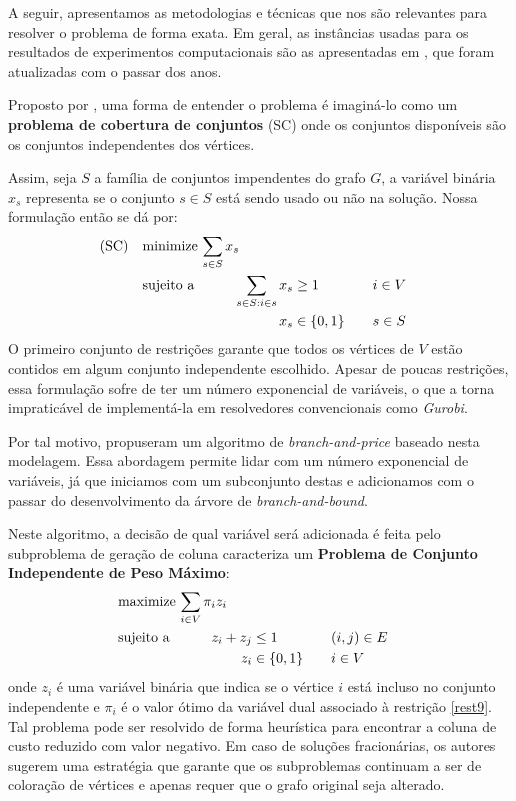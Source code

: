 \documentclass[10pt]{article}
\begin{document}
A seguir, apresentamos as metodologias e técnicas que nos são relevantes para resolver o problema de forma exata.
Em geral, as instâncias usadas para os resultados de experimentos computacionais são as apresentadas em \autocite{GraphColoringInstances}, que foram atualizadas com o passar dos anos.

Proposto por \textcite{Mehrotra1996ColumnGenerationApproach}, uma forma de entender o problema é imaginá-lo como um \textbf{problema de cobertura de conjuntos} (SC) onde os conjuntos disponíveis são os conjuntos independentes dos vértices.

Assim, seja \(S\) a família de conjuntos impendentes do grafo \(G\), a variável binária \(x_s\) representa se o conjunto \(s \in S\) está sendo usado ou não na solução. Nossa formulação então se dá por:
\begin{alignat}{4}
\mathrm{(SC)} \quad & \omit\rlap{minimize  $\displaystyle \sum_{s \in S} x_s$} \nonumber \\
& \mbox{sujeito a}&& \quad & \sum_{s \in S: i \in s} x_{s}&\geq 1 & \quad & i \in V \label{rest9} \\
&                 &&   & x_s       & \in \{0,1\} &    & s \in S \nonumber
\end{alignat}
O primeiro conjunto de restrições garante que todos os vértices de \(V\) estão contidos em algum conjunto independente escolhido.
Apesar de poucas restrições, essa formulação sofre de ter um número exponencial de variáveis, o que a torna impraticável de implementá-la em resolvedores convencionais como \emph{Gurobi}.

Por tal motivo, \textcite{Mehrotra1996ColumnGenerationApproach} propuseram um algoritmo de \emph{branch-and-price} baseado nesta modelagem.
Essa abordagem permite lidar com um número exponencial de variáveis, já que iniciamos com um subconjunto destas e adicionamos com o passar do desenvolvimento da árvore de \emph{branch-and-bound}.

Neste algoritmo, a decisão de qual variável será adicionada é feita pelo subproblema de geração de coluna caracteriza um \textbf{Problema de Conjunto Independente de Peso Máximo}:
\begin{alignat*}{4}
& \omit\rlap{maximize  $\displaystyle \sum_{i \in V} \pi_i z_i$} \\
& \mbox{sujeito a}&& \quad & z_i + z_j &\leq 1 & \quad & (i,j) \in E \\
&                 &&   & z_i       & \in \{0,1\} &    & i \in V
\end{alignat*}
onde \(z_i\) é uma variável binária que indica se o vértice \(i\) está incluso no conjunto independente e \(\pi_i\) é o valor ótimo da variável dual associado à restrição \eqref{rest9}.
Tal problema pode ser resolvido de forma heurística para encontrar a coluna de custo reduzido com valor negativo.
Em caso de soluções fracionárias, os autores sugerem uma estratégia que garante que os subproblemas continuam a ser de coloração de vértices e apenas requer que o grafo original seja alterado.
\end{document}
